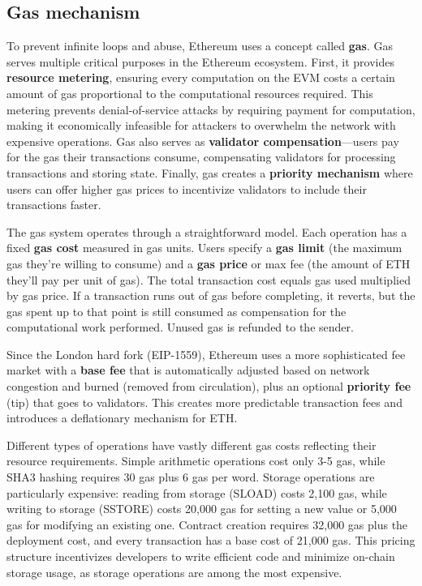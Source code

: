 \subsection{Gas mechanism}
To prevent infinite loops and abuse, Ethereum uses a concept called \textbf{gas}. Gas serves multiple critical purposes in the Ethereum ecosystem. First, it provides \textbf{resource metering}, ensuring every computation on the EVM costs a certain amount of gas proportional to the computational resources required. This metering prevents denial-of-service attacks by requiring payment for computation, making it economically infeasible for attackers to overwhelm the network with expensive operations. Gas also serves as \textbf{validator compensation}—users pay for the gas their transactions consume, compensating validators for processing transactions and storing state. Finally, gas creates a \textbf{priority mechanism} where users can offer higher gas prices to incentivize validators to include their transactions faster.

The gas system operates through a straightforward model. Each operation has a fixed \textbf{gas cost} measured in gas units. Users specify a \textbf{gas limit} (the maximum gas they're willing to consume) and a \textbf{gas price} or max fee (the amount of ETH they'll pay per unit of gas). The total transaction cost equals gas used multiplied by gas price. If a transaction runs out of gas before completing, it reverts, but the gas spent up to that point is still consumed as compensation for the computational work performed. Unused gas is refunded to the sender.

Since the London hard fork (EIP-1559), Ethereum uses a more sophisticated fee market with a \textbf{base fee} that is automatically adjusted based on network congestion and burned (removed from circulation), plus an optional \textbf{priority fee} (tip) that goes to validators. This creates more predictable transaction fees and introduces a deflationary mechanism for ETH.

Different types of operations have vastly different gas costs reflecting their resource requirements. Simple arithmetic operations cost only 3-5 gas, while SHA3 hashing requires 30 gas plus 6 gas per word. Storage operations are particularly expensive: reading from storage (SLOAD) costs 2,100 gas, while writing to storage (SSTORE) costs 20,000 gas for setting a new value or 5,000 gas for modifying an existing one. Contract creation requires 32,000 gas plus the deployment cost, and every transaction has a base cost of 21,000 gas. This pricing structure incentivizes developers to write efficient code and minimize on-chain storage usage, as storage operations are among the most expensive.

